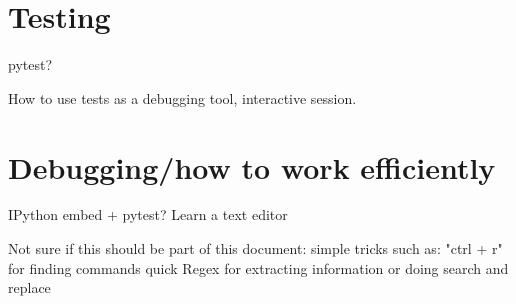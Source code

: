 \documentclass[11pt, a4paper, twoside]{report}
\begin{document}
\section*{Testing}
pytest?

How to use tests as a debugging tool, interactive session.


\section*{Debugging/how to work efficiently}
IPython embed + pytest?
Learn a text editor

Not sure if this should be part of this document:
simple tricks such as: "ctrl + r" for finding commands quick
Regex for extracting information or doing search and replace
\end{document}
